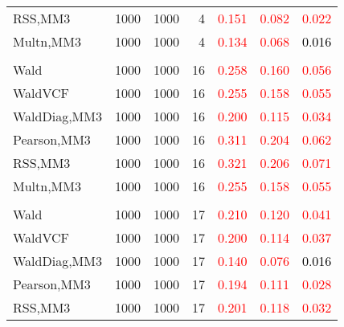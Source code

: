 \documentclass[
]{article}
\begin{document}
\begin{table}[H]
{\begin{tabular}[t]{lrrrrrr}
\hspace{1em}RSS,MM3 & 1000 & 1000 & 4 & \textcolor{red}{0.151} & \textcolor{red}{0.082} & \textcolor{red}{0.022}\\
\hspace{1em}Multn,MM3 & 1000 & 1000 & 4 & \textcolor{red}{0.134} & \textcolor{red}{0.068} & \textcolor{black}{0.016}\\
\addlinespace[0.3em]
\multicolumn{7}{l}{\textbf{1F 15V}}\\
\hspace{1em}Wald & 1000 & 1000 & 16 & \textcolor{red}{0.258} & \textcolor{red}{0.160} & \textcolor{red}{0.056}\\
\hspace{1em}WaldVCF & 1000 & 1000 & 16 & \textcolor{red}{0.255} & \textcolor{red}{0.158} & \textcolor{red}{0.055}\\
\hspace{1em}WaldDiag,MM3 & 1000 & 1000 & 16 & \textcolor{red}{0.200} & \textcolor{red}{0.115} & \textcolor{red}{0.034}\\
\hspace{1em}Pearson,MM3 & 1000 & 1000 & 16 & \textcolor{red}{0.311} & \textcolor{red}{0.204} & \textcolor{red}{0.062}\\
\hspace{1em}RSS,MM3 & 1000 & 1000 & 16 & \textcolor{red}{0.321} & \textcolor{red}{0.206} & \textcolor{red}{0.071}\\
\hspace{1em}Multn,MM3 & 1000 & 1000 & 16 & \textcolor{red}{0.255} & \textcolor{red}{0.158} & \textcolor{red}{0.055}\\
\addlinespace[0.3em]
\multicolumn{7}{l}{\textbf{2F 10V}}\\
\hspace{1em}Wald & 1000 & 1000 & 17 & \textcolor{red}{0.210} & \textcolor{red}{0.120} & \textcolor{red}{0.041}\\
\hspace{1em}WaldVCF & 1000 & 1000 & 17 & \textcolor{red}{0.200} & \textcolor{red}{0.114} & \textcolor{red}{0.037}\\
\hspace{1em}WaldDiag,MM3 & 1000 & 1000 & 17 & \textcolor{red}{0.140} & \textcolor{red}{0.076} & \textcolor{black}{0.016}\\
\hspace{1em}Pearson,MM3 & 1000 & 1000 & 17 & \textcolor{red}{0.194} & \textcolor{red}{0.111} & \textcolor{red}{0.028}\\
\hspace{1em}RSS,MM3 & 1000 & 1000 & 17 & \textcolor{red}{0.201} & \textcolor{red}{0.118} & \textcolor{red}{0.032}\\

\end{tabular}}
\end{table}
\end{document}
